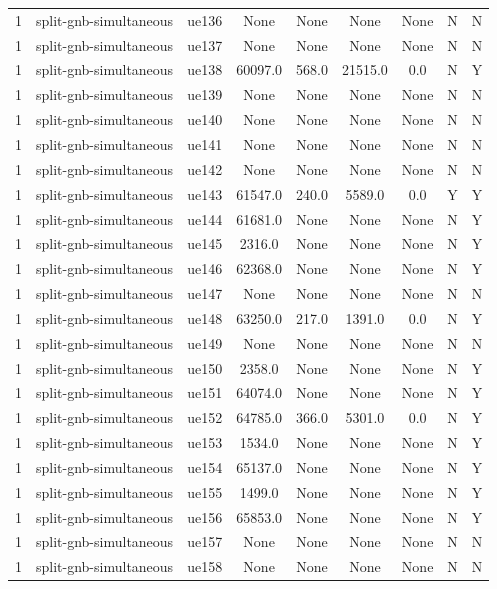 \begin{table}[ht]
\begin{tabular}{|c|c|c|c|c|c|c|c|c|}
1 & split-gnb-simultaneous & ue136 & None & None & None & None & N & N \\
1 & split-gnb-simultaneous & ue137 & None & None & None & None & N & N \\
1 & split-gnb-simultaneous & ue138 & 60097.0 & 568.0 & 21515.0 & 0.0 & N & Y \\
1 & split-gnb-simultaneous & ue139 & None & None & None & None & N & N \\
1 & split-gnb-simultaneous & ue140 & None & None & None & None & N & N \\
1 & split-gnb-simultaneous & ue141 & None & None & None & None & N & N \\
1 & split-gnb-simultaneous & ue142 & None & None & None & None & N & N \\
1 & split-gnb-simultaneous & ue143 & 61547.0 & 240.0 & 5589.0 & 0.0 & Y & Y \\
1 & split-gnb-simultaneous & ue144 & 61681.0 & None & None & None & N & Y \\
1 & split-gnb-simultaneous & ue145 & 2316.0 & None & None & None & N & Y \\
1 & split-gnb-simultaneous & ue146 & 62368.0 & None & None & None & N & Y \\
1 & split-gnb-simultaneous & ue147 & None & None & None & None & N & N \\
1 & split-gnb-simultaneous & ue148 & 63250.0 & 217.0 & 1391.0 & 0.0 & N & Y \\
1 & split-gnb-simultaneous & ue149 & None & None & None & None & N & N \\
1 & split-gnb-simultaneous & ue150 & 2358.0 & None & None & None & N & Y \\
1 & split-gnb-simultaneous & ue151 & 64074.0 & None & None & None & N & Y \\
1 & split-gnb-simultaneous & ue152 & 64785.0 & 366.0 & 5301.0 & 0.0 & N & Y \\
1 & split-gnb-simultaneous & ue153 & 1534.0 & None & None & None & N & Y \\
1 & split-gnb-simultaneous & ue154 & 65137.0 & None & None & None & N & Y \\
1 & split-gnb-simultaneous & ue155 & 1499.0 & None & None & None & N & Y \\
1 & split-gnb-simultaneous & ue156 & 65853.0 & None & None & None & N & Y \\
1 & split-gnb-simultaneous & ue157 & None & None & None & None & N & N \\
1 & split-gnb-simultaneous & ue158 & None & None & None & None & N & N \\

\end{tabular}
\end{table}
